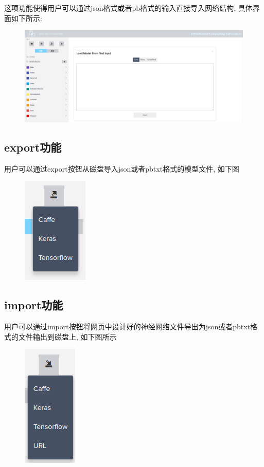 \documentclass{progbookcn}
\begin{document}
这项功能使得用户可以通过json格式或者pb格式的输入直接导入网络结构, 具体界面如下所示:
\begin{figure}[H]
  \centering
  \includegraphics[width=0.98\linewidth]{load_from_text.png}
\end{figure}

\subsection{export功能}

用户可以通过export按钮从磁盘导入json或者pbtxt格式的模型文件, 如下图
\begin{figure}[H]
  \centering
  \includegraphics{export.png}
\end{figure}

\subsection{import功能}

用户可以通过import按钮将网页中设计好的神经网络文件导出为json或者pbtxt格式的文件输出到磁盘上, 如下图所示
\begin{figure}[H]
  \centering
  \includegraphics{import.png}
\end{figure}
\end{document}
